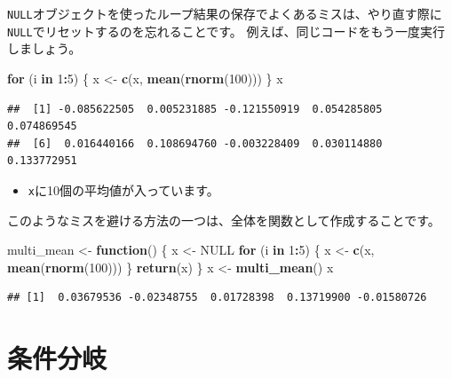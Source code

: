 \documentclass[]{bxjsreport}
\newenvironment{Shaded}{\begin{snugshade}}{\end{snugshade}}
\newcommand{\ControlFlowTok}[1]{\textcolor[rgb]{0.13,0.29,0.53}{\textbf{#1}}}
\newcommand{\DecValTok}[1]{\textcolor[rgb]{0.00,0.00,0.81}{#1}}
\newcommand{\KeywordTok}[1]{\textcolor[rgb]{0.13,0.29,0.53}{\textbf{#1}}}
\newcommand{\NormalTok}[1]{#1}
\newcommand{\OperatorTok}[1]{\textcolor[rgb]{0.81,0.36,0.00}{\textbf{#1}}}
\newcommand{\OtherTok}[1]{\textcolor[rgb]{0.56,0.35,0.01}{#1}}
\newcommand{\StringTok}[1]{\textcolor[rgb]{0.31,0.60,0.02}{#1}}
\providecommand{\tightlist}{%
  \setlength{\itemsep}{0pt}\setlength{\parskip}{0pt}}
\let\asdf\section
\renewcommand{\section}{\chapter}
\renewcommand{\subsection}{\asdf}
\begin{document}
\texttt{NULL}オブジェクトを使ったループ結果の保存でよくあるミスは、やり直す際に\texttt{NULL}でリセットするのを忘れることです。
例えば、同じコードをもう一度実行しましょう。

\begin{Shaded}
\begin{Highlighting}[]
\ControlFlowTok{for}\NormalTok{ (i }\ControlFlowTok{in} \DecValTok{1}\OperatorTok{:}\DecValTok{5}\NormalTok{) \{}
\NormalTok{  x <-}\StringTok{ }\KeywordTok{c}\NormalTok{(x, }\KeywordTok{mean}\NormalTok{(}\KeywordTok{rnorm}\NormalTok{(}\DecValTok{100}\NormalTok{)))}
\NormalTok{\}}
\NormalTok{x}
\end{Highlighting}
\end{Shaded}

\begin{verbatim}
##  [1] -0.085622505  0.005231885 -0.121550919  0.054285805  0.074869545
##  [6]  0.016440166  0.108694760 -0.003228409  0.030114880  0.133772951
\end{verbatim}

\begin{itemize}
\tightlist
\item
  \texttt{x}に10個の平均値が入っています。
\end{itemize}

このようなミスを避ける方法の一つは、全体を関数として作成することです。

\begin{Shaded}
\begin{Highlighting}[]
\NormalTok{multi_mean <-}\StringTok{ }\ControlFlowTok{function}\NormalTok{() \{}
\NormalTok{  x <-}\StringTok{ }\OtherTok{NULL}
  \ControlFlowTok{for}\NormalTok{ (i }\ControlFlowTok{in} \DecValTok{1}\OperatorTok{:}\DecValTok{5}\NormalTok{) \{}
\NormalTok{    x <-}\StringTok{ }\KeywordTok{c}\NormalTok{(x, }\KeywordTok{mean}\NormalTok{(}\KeywordTok{rnorm}\NormalTok{(}\DecValTok{100}\NormalTok{)))}
\NormalTok{  \}}
  \KeywordTok{return}\NormalTok{(x)}
\NormalTok{\}}
\NormalTok{x <-}\StringTok{ }\KeywordTok{multi_mean}\NormalTok{()}
\NormalTok{x}
\end{Highlighting}
\end{Shaded}

\begin{verbatim}
## [1]  0.03679536 -0.02348755  0.01728398  0.13719900 -0.01580726
\end{verbatim}

\hypertarget{ux6761ux4ef6ux5206ux5c90}{%
\subsection{条件分岐}\label{ux6761ux4ef6ux5206ux5c90}}
\end{document}
